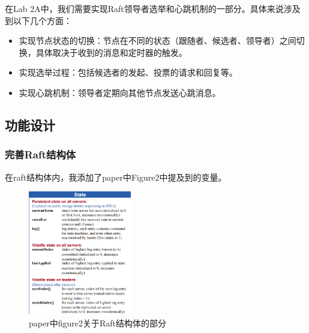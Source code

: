 \documentclass[]{article}
\begin{document}
	在Lab 2A中，我们需要实现Raft领导者选举和心跳机制的一部分。具体来说涉及到以下几个方面：
	\begin{itemize}
	\item 实现节点状态的切换：节点在不同的状态（跟随者、候选者、领导者）之间切换，具体取决于收到的消息和定时器的触发。
	\item 实现选举过程：包括候选者的发起、投票的请求和回复等。
	\item 实现心跳机制：领导者定期向其他节点发送心跳消息。
	\end{itemize}

	\subsection{功能设计}
	\subsubsection{完善Raft结构体}
	在raft结构体内，我添加了paper中Figure2中提及到的变量。
	\begin{figure}[H]
		\centering
		\includegraphics[width=0.4\textwidth]{./figure1.png}
		\caption{paper中figure2关于Raft结构体的部分}
	\end{figure}
	
\end{document}
